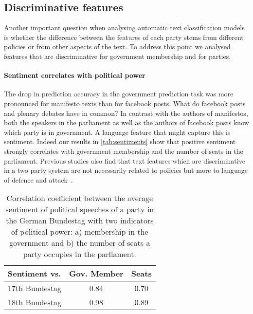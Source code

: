\documentclass[11pt]{article}
\begin{document}
\subsection{Discriminative features}
\label{sec:discrim_effect}
Another important question when analysing automatic text classification models is whether the difference between the features of each party stems from different policies or from other aspects of the text. To address this point we analysed features that are discriminative for government membership and for parties.

\paragraph{Sentiment correlates with political power}
The drop in prediction accuracy in the government prediction task was more pronounced for manifesto texts than for facebook posts. What do facebook posts and plenary debates have in common? In contrast with the authors of manifestos, both the speakers in the parliament as well as the authors of facebook posts know which party is in government. A language feature that might capture this is sentiment. 
Indeed our results in \autoref{tab:sentiments} show that positive sentiment strongly correlates with government membership and the number of seats in the parliament. Previous studies also find that text features which are discriminative in a two party system are not necessarily related to policies but more to language of defence and attack~\cite{Hirst2014}. 

\begin{table}[t]
\caption{
\label{tab:sentiments}
Correlation coefficient between the average sentiment of political speeches of a party in the German Bundestag with two indicators of political power: a) membership in the government and b) the number of seats a party occupies in the parliament.
}
\begin{center}
\begin{tabular}{lcc}
   Sentiment vs. &          Gov. Member    &  Seats\\
\hline\hline
17th Bundestag    &  0.84 & 0.70\\
18th Bundestag   &  0.98 & 0.89\\
%
\end{tabular}
\end{center}
\end{table}
\end{document}
